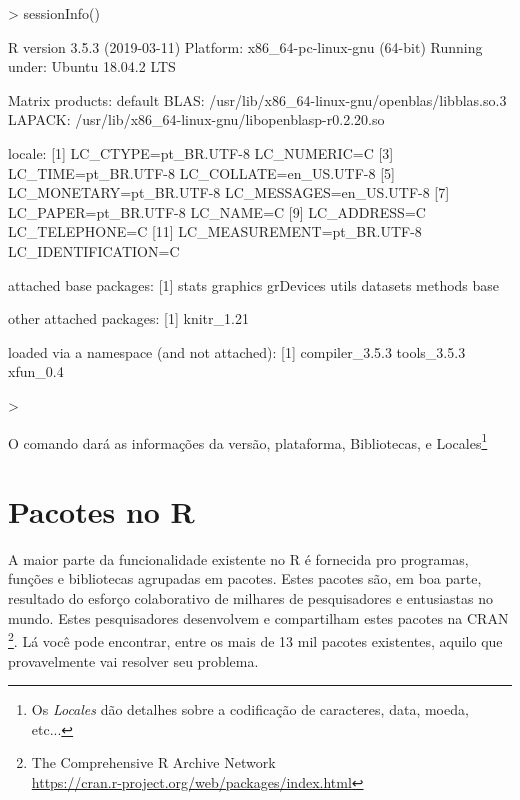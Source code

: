 \documentclass[12pt,a4paper,oneside]{erdc}
\begin{document}
\begin{Schunk}
\begin{Sinput}
> sessionInfo()
\end{Sinput}
\begin{Soutput}
R version 3.5.3 (2019-03-11)
Platform: x86_64-pc-linux-gnu (64-bit)
Running under: Ubuntu 18.04.2 LTS

Matrix products: default
BLAS: /usr/lib/x86_64-linux-gnu/openblas/libblas.so.3
LAPACK: /usr/lib/x86_64-linux-gnu/libopenblasp-r0.2.20.so

locale:
 [1] LC_CTYPE=pt_BR.UTF-8       LC_NUMERIC=C              
 [3] LC_TIME=pt_BR.UTF-8        LC_COLLATE=en_US.UTF-8    
 [5] LC_MONETARY=pt_BR.UTF-8    LC_MESSAGES=en_US.UTF-8   
 [7] LC_PAPER=pt_BR.UTF-8       LC_NAME=C                 
 [9] LC_ADDRESS=C               LC_TELEPHONE=C            
[11] LC_MEASUREMENT=pt_BR.UTF-8 LC_IDENTIFICATION=C       

attached base packages:
[1] stats     graphics  grDevices utils     datasets  methods   base     

other attached packages:
[1] knitr_1.21

loaded via a namespace (and not attached):
[1] compiler_3.5.3 tools_3.5.3    xfun_0.4      
\end{Soutput}
\begin{Sinput}
> 
\end{Sinput}
\end{Schunk}


O comando dará as informações da versão, plataforma, Bibliotecas, e Locales\footnote{Os \textit{Locales} dão detalhes sobre a codificação de caracteres, data, moeda, etc...}




\section{Pacotes no R}
\label{sec:Pacotes}

A maior parte da funcionalidade existente no R é fornecida pro programas, funções e bibliotecas agrupadas em pacotes. Estes pacotes são, em boa parte, resultado do esforço colaborativo de milhares de pesquisadores e entusiastas no mundo. Estes pesquisadores desenvolvem e compartilham estes pacotes na CRAN \footnote{The Comprehensive R Archive Network \\ \url{https://cran.r-project.org/web/packages/index.html}}. Lá você pode encontrar, entre os mais de 13 mil pacotes existentes, aquilo que  provavelmente vai resolver seu problema.
\end{document}
